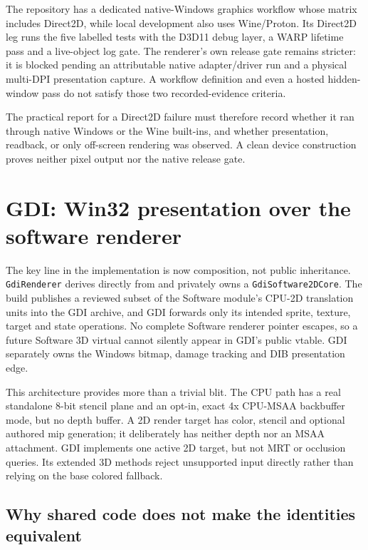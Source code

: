 The repository has a dedicated native-Windows graphics workflow whose matrix includes Direct2D,
while local development also uses Wine/Proton. Its Direct2D leg runs the five labelled tests with
the D3D11 debug layer, a WARP lifetime pass and a live-object log gate. The renderer's own release
gate remains stricter: it is blocked pending an attributable native adapter/driver run and a
physical multi-DPI presentation capture. A workflow definition and even a hosted hidden-window
pass do not satisfy those two recorded-evidence criteria.

The practical report for a Direct2D failure must therefore record whether it ran through native
Windows or the Wine built-ins, and whether presentation, readback, or only off-screen rendering
was observed.  A clean device construction proves neither pixel output nor the native release
gate.

\section{GDI: Win32 presentation over the software renderer}

The key line in the implementation is now composition, not public inheritance.
\texttt{GdiRenderer} derives directly from  and privately owns a
\texttt{GdiSoftware2DCore}. The build publishes a reviewed subset of the Software module's CPU-2D
translation units into the GDI archive, and GDI forwards only its intended sprite, texture,
target and state operations. No complete Software renderer pointer escapes, so a future Software
3D virtual cannot silently appear in GDI's public vtable. GDI separately owns the Windows bitmap,
damage tracking and DIB presentation edge.

This architecture provides more than a trivial blit. The CPU path has a real standalone 8-bit
stencil plane and an opt-in, exact 4x CPU-MSAA backbuffer mode, but no depth buffer. A 2D render
target has color, stencil and optional authored mip generation; it deliberately has neither
depth nor an MSAA attachment. GDI implements one active 2D target, but not MRT or occlusion
queries. Its extended 3D methods reject unsupported input directly rather than relying on the
base colored fallback.

\subsection{Why shared code does not make the identities equivalent}

